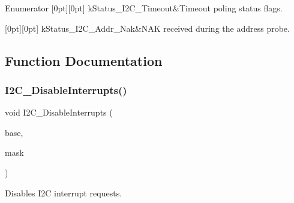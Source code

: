 \begin{DoxyEnumFields}{Enumerator}
[0pt][0pt]{}\mbox{\label{group__i2c__driver_gga7cc91c89125c25a88e463a9e8550b284a81ad7cc198436cabbe91ea55c5288747}} 
k\+Status\+\_\+\+I2\+C\+\_\+\+Timeout&Timeout poling status flags. \\
\hline

[0pt][0pt]{}\mbox{\label{group__i2c__driver_gga7cc91c89125c25a88e463a9e8550b284adf7437bfedcc0d57338ed33f1be5c805}} 
k\+Status\+\_\+\+I2\+C\+\_\+\+Addr\+\_\+\+Nak&N\+AK received during the address probe. \\
\hline

\end{DoxyEnumFields}


\subsection{Function Documentation}
\mbox{\label{group__i2c__driver_ga9839c1fd49a0f62f42b0adfa74f62853}} 
\subsubsection{\texorpdfstring{I2C\_DisableInterrupts()}{I2C\_DisableInterrupts()}}
{\footnotesize\ttfamily void I2\+C\+\_\+\+Disable\+Interrupts (\begin{DoxyParamCaption}\item[{\mbox{\hyperlink{struct_i2_c___type}{I2\+C\+\_\+\+Type}} $\ast$}]{base,  }\item[{uint32\+\_\+t}]{mask }\end{DoxyParamCaption})}



Disables I2C interrupt requests. 


